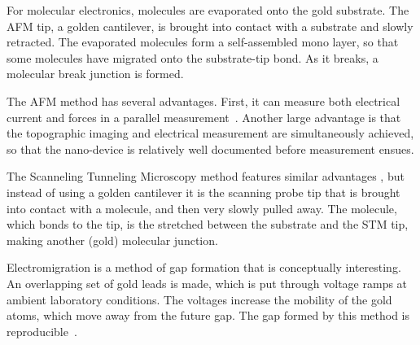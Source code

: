 For molecular electronics, molecules are evaporated onto the gold substrate. The AFM tip, a golden cantilever, is brought into contact with a substrate and slowly retracted. The evaporated molecules form a self-assembled mono layer, so that some molecules have migrated onto the substrate-tip bond. As it breaks, a molecular break junction is formed.

The AFM method has several advantages. First, it can measure both electrical current and forces in a parallel measurement~\cite{nef}. Another large advantage is that the topographic imaging and electrical measurement are simultaneously achieved, so that the nano-device is relatively well documented before measurement ensues.

The Scanneling Tunneling Microscopy method features similar advantages \cite{Joachim2000}, but instead of using a golden cantilever it is the scanning probe tip that is brought into contact with a molecule, and then very slowly pulled away. The molecule, which bonds to the tip, is the stretched between the substrate and the STM tip, making another (gold) molecular junction.

Electromigration is a method of gap formation that is conceptually interesting. An overlapping set of gold leads is made, which is put through voltage ramps at ambient laboratory conditions. The voltages increase the mobility of the gold atoms, which move away from the future gap. The gap formed by this method is reproducible~\cite{electromigration}.

